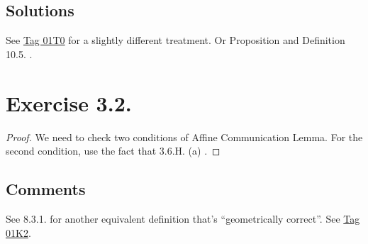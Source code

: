 \begin{comment}
    For the first condition. Suppose $V=\Spec B$ has the property. Then we wish to check $\Spec B_g$ has the property for any $g\in B$. We know $f^{-1}(V)$ can be covered by $U_j=\Spec A_j$ where $A_j$ is f.g. $B$-algebra. Therefore 
    \[f^{-1}(\Spec B_g)=\bigcup U_j\cap f^{-1}(\Spec B_g).\]For each $U_j\cap f^{-1}(\Spec B_g)$, by the virtue of 5.3.1. Proposition of Rising Sea \cite{RaviRisingSea}, it could be covered by distinguished open subsets $D_{U_j}(a_{\bullet})$ for some $a_{\bullet}\in A_j$ (here $f^{-1}(\Spec B_g)$ is open, hence admits a covering by open affine subsets. Pick one of such open affine and intersection with open affine subset $U_j$). And all such distinguished open subsets can indeed cover $f^{-1}(\Spec B_g)$. 

    The global section of any such distinguished open is a localisation of $A_i$ at one element $a_{\bullet}$. While $A_i$ is assumed to be f.g. $B$-algebra, hence we know $\{1,a_{\bullet},...\}^{-1}A_i$ 

    I lost information about g, ???
\end{comment}

\subsection{Solutions}

See \href{https://stacks.math.columbia.edu/tag/01T0}{Tag 01T0} for a slightly different treatment. Or Proposition and Definition 10.5. \cite{gortz2020algebraic}.

\section{Exercise 3.2.}

\begin{proof}
We need to check two conditions of Affine Communication Lemma. For the second condition, use the fact that 3.6.H. (a) \cite{RaviRisingSea}. 

\end{proof}

\subsection{Comments}

See 8.3.1. \cite{RaviRisingSea} for another equivalent definition that's \enquote{geometrically correct}. See \href{https://stacks.math.columbia.edu/tag/01K2}{Tag 01K2}.

